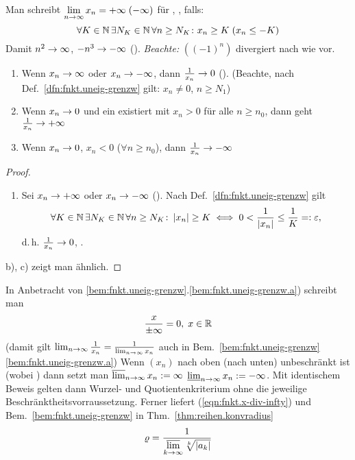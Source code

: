 \documentclass[12pt]{scrreprt}
\begin{document}
\begin{dfn}\label{dfn:fnkt.uneig-grenzw}
Man schreibt $\lim\limits_{n\rightarrow\infty} x_n = +\infty\; (-\infty)$ für , , falls:
\[\forall K\in\mathbb{N}\,\exists N_K\in\mathbb{N}\,\forall n\ge N_K\colon x_n \ge K\; (x_n \le -K)\]
Damit $n^2 \rightarrow \infty$, $-n^3 \rightarrow -\infty$ (\ninf). \emph{Beachte:} $\left((-1)^n\right)$ divergiert nach wie vor.
\end{dfn}

\begin{bem}\label{bem:fnkt.uneig-grenzw}
\begin{enumerate}
\item Wenn $x_n\rightarrow\infty$ oder $x_n\rightarrow -\infty$, dann $\frac{1}{x_n}\rightarrow 0$ (\ninf). (Beachte, nach 
Def.~\ref{dfn:fnkt.uneig-grenzw} gilt: $x_n \neq 0$, $n \ge N_1$)\label{bem:fnkt.uneig-grenzw.a}
\item Wenn $x_n \rightarrow 0$ und ein  existiert mit $x_n > 0$ für alle $n \ge n_0$, dann geht $\frac{1}{x_n}\rightarrow +\infty$\label{bem:fnkt.uneig-grenzw.b}
\item Wenn $x_n \rightarrow 0$, $x_n < 0$ ($\forall n \ge n_0$), dann $\frac{1}{x_n}\rightarrow -\infty$\label{bem:fnkt.uneig-grenzw.c}
\end{enumerate}
\end{bem}
\begin{proof}
\begin{enumerate}
\item Sei $x_n\rightarrow +\infty$ oder $x_n\rightarrow -\infty$ (\ninf). Nach Def.~\ref{dfn:fnkt.uneig-grenzw} gilt
\[\forall K\in\mathbb{N}\,\exists N_K\in\mathbb{N}\,\forall n\ge N_K\colon \left\lvert x_n\right\lvert \ge K \iff 0 < \frac{1}{\left\lvert x_n\right\lvert} \le \frac{1}{K} =: \varepsilon,\]
d.\,h. $\frac{1}{x_n} \rightarrow 0$, \ninf.
\end{enumerate}

b), c) zeigt man ähnlich.
\end{proof}

\noindent In Anbetracht von \ref{bem:fnkt.uneig-grenzw}.\ref{bem:fnkt.uneig-grenzw.a}) %
schreibt man 
\begin{equation}\label{eqn:fnkt.x-div-infty}
\frac{x}{\pm\infty} = 0,\;x\in\mathbb{R}
\end{equation}
(damit gilt $\lim_{n\rightarrow\infty}\frac{1}{x_n} = \frac{1}{\lim_{n\rightarrow\infty} x_n}$ auch in Bem.~\ref{bem:fnkt.uneig-grenzw}\ref{bem:fnkt.uneig-grenzw.a})
Wenn $(x_n)$ nach oben (nach unten) unbeschränkt ist (wobei ) dann setzt man $\varlimsup_{n\rightarrow\infty} x_n:=\infty$ $\varliminf_{n\rightarrow\infty} x_n := -\infty$.
Mit identischem Beweis gelten dann Wurzel- und Quotientenkriterium ohne die jeweilige Beschränktheitsvorraussetzung. 
Ferner liefert (\ref{eqn:fnkt.x-div-infty}) und Bem.~\ref{bem:fnkt.uneig-grenzw} in Thm.~\ref{thm:reihen.konvradius}
\[\varrho = \frac{1}{\varlimsup\limits_{k\rightarrow\infty}\sqrt[k]{\left\lvert a_k\right\lvert}}\]
\end{document}

